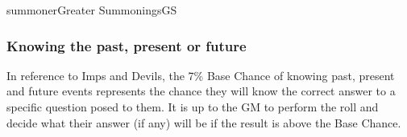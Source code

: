 \begin{college}[1.0]{summoner}{Greater Summonings}{GS}
\subsubsection{Knowing the past, present or future}

In reference to Imps and Devils, the 7\% Base Chance of knowing past,
present and future events represents the chance they will know the
correct answer to a specific question posed to them. It is up to the
GM to perform the roll and decide what their answer (if any) will be
if the result is above the Base Chance.
\end{college}
